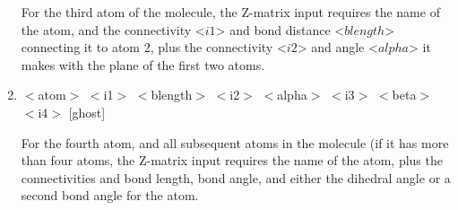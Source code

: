 \begin{enumerate}
    For the third atom of the molecule, the Z-matrix input requires the
    name of the atom, and the connectivity <$i1$> and bond distance 
    <$blength$> connecting it to atom 2, plus the connectivity <$i2$>
    and angle <$alpha$> it makes with the plane of the first two atoms. 

   \item $<$atom$>$ $<$i1$>$ $<$blength$>$ $<$i2$>$ $<$alpha$>$ $<$i3$>$ $<$beta$>$ $<$i4$>$ [ghost] %

    For the fourth atom, and all subsequent atoms in the molecule (if it
    has more than four atoms, the Z-matrix input requires the name of the atom,
    plus the connectivities and bond length,
    bond angle, and either the dihedral angle or a second bond angle
    for the atom.
        

\end{enumerate}

